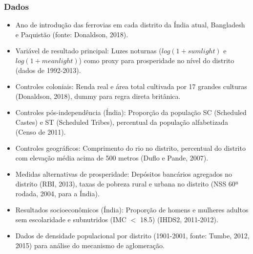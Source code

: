 \documentclass[12pt]{article}
\begin{document}
\subsubsection*{Dados}
\begin{itemize}
    \item Ano de introdução das ferrovias em cada distrito da Índia atual, Bangladesh e Paquistão (fonte: Donaldson, 2018).
    \item Variável de resultado principal: Luzes noturnas ($log(1+sumlight)$ e $log(1+meanlight)$) como proxy para prosperidade no nível do distrito (dados de 1992-2013).
    \item Controles coloniais: Renda real e área total cultivada por 17 grandes culturas (Donaldson, 2018), dummy para regra direta britânica.
    \item Controles pós-independência (Índia): Proporção da população SC (Scheduled Castes) e ST (Scheduled Tribes), percentual da população alfabetizada (Censo de 2011).
    \item Controles geográficos: Comprimento do rio no distrito, percentual do distrito com elevação média acima de 500 metros (Duflo e Pande, 2007).
    \item Medidas alternativas de prosperidade: Depósitos bancários agregados no distrito (RBI, 2013), taxas de pobreza rural e urbana no distrito (NSS 60ª rodada, 2004, para a Índia).
    \item Resultados socioeconômicos (Índia): Proporção de homens e mulheres adultos sem escolaridade e subnutridos (IMC $<$ 18.5) (IHDS2, 2011-2012).
    \item Dados de densidade populacional por distrito (1901-2001, fonte: Tumbe, 2012, 2015) para análise do mecanismo de aglomeração.
\end{itemize}
\end{document}
